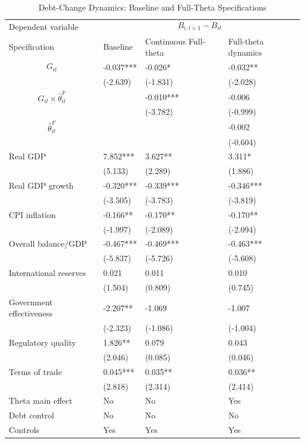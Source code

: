 \begin{table}[H]\centering
\begin{threeparttable}
\caption{Debt-Change Dynamics: Baseline and Full-Theta Specifications}
\label{tab:debt_change_combined_fulltheta}
\scriptsize
\begin{tabularx}{\textwidth}{lYYY}
\toprule
Dependent variable &  \\
\cmidrule(lr){2-4}
Specification & Baseline & Continuous Full-theta & Full-theta dynamics \\
\midrule
$$G_{it}$$ & -0.037*** & -0.026* & -0.032** \\
 & (-2.639) & (-1.831) & (-2.028) \\
$$G_{it}\times\widehat{\theta}^{F}_{it}$$ &  & -0.010*** & -0.006 \\
 &  & (-3.782) & (-0.999) \\
$$\widehat{\theta}^{F}_{it}$$ &  &  & -0.002 \\
 &  &  & (-0.604) \\
Real GDP & 7.852*** & 3.627** & 3.311* \\
 & (5.133) & (2.289) & (1.886) \\
Real GDP growth & -0.320*** & -0.339*** & -0.346*** \\
 & (-3.505) & (-3.783) & (-3.819) \\
CPI inflation & -0.166** & -0.170** & -0.170** \\
 & (-1.997) & (-2.089) & (-2.094) \\
Overall balance/GDP & -0.467*** & -0.469*** & -0.463*** \\
 & (-5.837) & (-5.726) & (-5.608) \\
International reserves & 0.021 & 0.011 & 0.010 \\
 & (1.504) & (0.809) & (0.745) \\
Government effectiveness & -2.207** & -1.069 & -1.007 \\
 & (-2.323) & (-1.086) & (-1.004) \\
Regulatory quality & 1.826** & 0.079 & 0.043 \\
 & (2.046) & (0.085) & (0.046) \\
Terms of trade & 0.045*** & 0.035** & 0.036** \\
 & (2.818) & (2.314) & (2.414) \\
\midrule
Theta main effect & No & No & Yes \\
Debt control & No & No & No \\
Controls & Yes & Yes & Yes \\

\end{tabularx}
\end{threeparttable}
\end{table}
